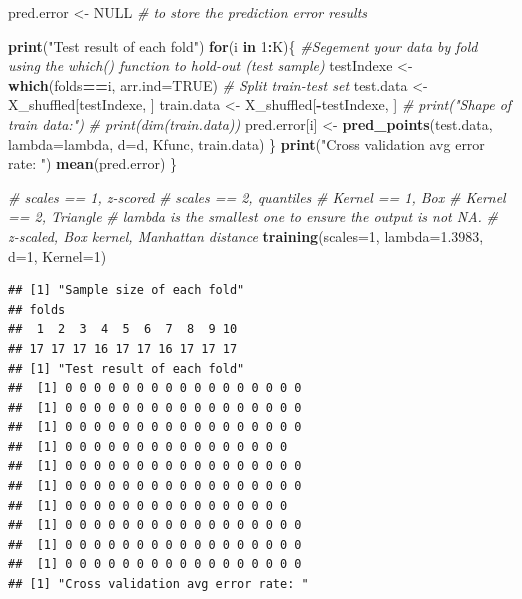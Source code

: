 \documentclass[12pt]{article}
\newenvironment{Shaded}{\begin{snugshade}}{\end{snugshade}}
\newcommand{\AttributeTok}[1]{\textcolor[rgb]{0.13,0.29,0.53}{#1}}
\newcommand{\CommentTok}[1]{\textcolor[rgb]{0.56,0.35,0.01}{\textit{#1}}}
\newcommand{\ConstantTok}[1]{\textcolor[rgb]{0.56,0.35,0.01}{#1}}
\newcommand{\ControlFlowTok}[1]{\textcolor[rgb]{0.13,0.29,0.53}{\textbf{#1}}}
\newcommand{\DecValTok}[1]{\textcolor[rgb]{0.00,0.00,0.81}{#1}}
\newcommand{\FloatTok}[1]{\textcolor[rgb]{0.00,0.00,0.81}{#1}}
\newcommand{\FunctionTok}[1]{\textcolor[rgb]{0.13,0.29,0.53}{\textbf{#1}}}
\newcommand{\NormalTok}[1]{#1}
\newcommand{\OtherTok}[1]{\textcolor[rgb]{0.56,0.35,0.01}{#1}}
\newcommand{\SpecialCharTok}[1]{\textcolor[rgb]{0.81,0.36,0.00}{\textbf{#1}}}
\newcommand{\StringTok}[1]{\textcolor[rgb]{0.31,0.60,0.02}{#1}}
\begin{document}
\begin{Shaded}
\begin{Highlighting}[]
\NormalTok{pred.error }\OtherTok{\textless{}{-}} \ConstantTok{NULL} \CommentTok{\# to store the prediction error results}

\FunctionTok{print}\NormalTok{(}\StringTok{"Test result of each fold"}\NormalTok{)}
\ControlFlowTok{for}\NormalTok{(i }\ControlFlowTok{in} \DecValTok{1}\SpecialCharTok{:}\NormalTok{K)\{}
\CommentTok{\#Segement your data by fold using the which() function to hold{-}out (test sample)}
\NormalTok{testIndexe }\OtherTok{\textless{}{-}} \FunctionTok{which}\NormalTok{(folds}\SpecialCharTok{==}\NormalTok{i, }\AttributeTok{arr.ind=}\ConstantTok{TRUE}\NormalTok{)}
\CommentTok{\# Split train{-}test set}
\NormalTok{test.data }\OtherTok{\textless{}{-}}\NormalTok{ X\_shuffled[testIndexe, ]}
\NormalTok{train.data }\OtherTok{\textless{}{-}}\NormalTok{ X\_shuffled[}\SpecialCharTok{{-}}\NormalTok{testIndexe, ]}
\CommentTok{\# print("Shape of train data:")}
\CommentTok{\# print(dim(train.data))}
\NormalTok{pred.error[i] }\OtherTok{\textless{}{-}} \FunctionTok{pred\_points}\NormalTok{(test.data, }\AttributeTok{lambda=}\NormalTok{lambda, }\AttributeTok{d=}\NormalTok{d, Kfunc, train.data)}
\NormalTok{\}}
\FunctionTok{print}\NormalTok{(}\StringTok{"Cross validation avg error rate: "}\NormalTok{)}
\FunctionTok{mean}\NormalTok{(pred.error)}
\NormalTok{\}}

\CommentTok{\# scales == 1, z{-}scored}
\CommentTok{\# scales == 2, quantiles}
\CommentTok{\# Kernel == 1, Box}
\CommentTok{\# Kernel == 2, Triangle}
\CommentTok{\# lambda is the smallest one to ensure the output is not NA.}
\CommentTok{\# z{-}scaled, Box kernel, Manhattan distance}
\FunctionTok{training}\NormalTok{(}\AttributeTok{scales=}\DecValTok{1}\NormalTok{, }\AttributeTok{lambda=}\FloatTok{1.3983}\NormalTok{, }\AttributeTok{d=}\DecValTok{1}\NormalTok{, }\AttributeTok{Kernel=}\DecValTok{1}\NormalTok{)}
\end{Highlighting}
\end{Shaded}

\begin{verbatim}
## [1] "Sample size of each fold"
## folds
##  1  2  3  4  5  6  7  8  9 10 
## 17 17 17 16 17 17 16 17 17 17 
## [1] "Test result of each fold"
##  [1] 0 0 0 0 0 0 0 0 0 0 0 0 0 0 0 0 0
##  [1] 0 0 0 0 0 0 0 0 0 0 0 0 0 0 0 0 0
##  [1] 0 0 0 0 0 0 0 0 0 0 0 0 0 0 0 0 0
##  [1] 0 0 0 0 0 0 0 0 0 0 0 0 0 0 0 0
##  [1] 0 0 0 0 0 0 0 0 0 0 0 0 0 0 0 0 0
##  [1] 0 0 0 0 0 0 0 0 0 0 0 0 0 0 0 0 0
##  [1] 0 0 0 0 0 0 0 0 0 0 0 0 0 0 0 0
##  [1] 0 0 0 0 0 0 0 0 0 0 0 0 0 0 0 0 0
##  [1] 0 0 0 0 0 0 0 0 0 0 0 0 0 0 0 0 0
##  [1] 0 0 0 0 0 0 0 0 0 0 0 0 0 0 0 0 0
## [1] "Cross validation avg error rate: "
\end{verbatim}
\end{document}
